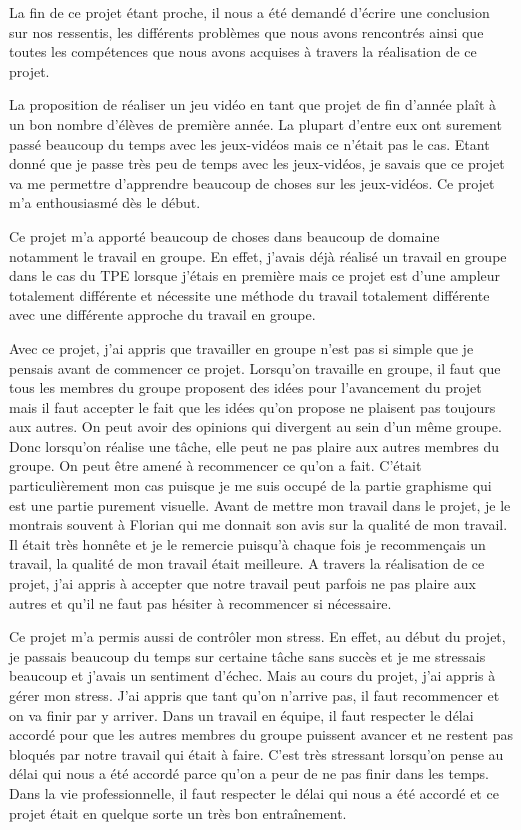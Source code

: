 \documentclass[a4paper, 12pt]{article}
\begin{document}
La fin de ce projet étant proche, il nous a été demandé d’écrire une conclusion sur nos ressentis, les différents problèmes que nous avons rencontrés ainsi que toutes les compétences que nous avons acquises à travers la réalisation de ce projet.
\medbreak
\par La proposition de réaliser un jeu vidéo en tant que projet de fin d’année plaît à un bon nombre d’élèves de première année. La plupart d’entre eux ont surement passé beaucoup du temps avec les jeux-vidéos mais ce n’était pas le cas. Etant donné que je passe très peu de temps avec les jeux-vidéos, je savais que ce projet va me permettre d’apprendre beaucoup de choses sur les jeux-vidéos. Ce projet m’a enthousiasmé dès le début.
\medbreak
\par Ce projet m’a apporté beaucoup de choses dans beaucoup de domaine notamment le travail en groupe. En effet, j’avais déjà réalisé un travail en groupe dans le cas du TPE lorsque j’étais en première mais ce projet est d’une ampleur totalement différente et nécessite une méthode du travail totalement différente avec une différente approche du travail en groupe.
\medbreak
\par Avec ce projet, j’ai appris que travailler en groupe n’est pas si simple que je pensais avant de commencer ce projet. Lorsqu’on travaille en groupe, il faut que tous les membres du groupe proposent des idées pour l’avancement du projet mais il faut accepter le fait que les idées qu’on propose ne plaisent pas toujours aux autres. On peut avoir des opinions qui divergent au sein d’un même groupe. Donc lorsqu’on réalise une tâche, elle peut ne pas plaire aux autres membres du groupe.  On peut être amené à recommencer ce qu’on a fait. C’était particulièrement mon cas puisque je me suis occupé de la partie graphisme qui est une partie purement visuelle.  Avant de mettre mon travail dans le projet, je le montrais souvent à Florian qui me donnait son avis sur la qualité de mon travail. Il était très honnête et je le remercie puisqu’à chaque fois je recommençais un travail, la qualité de mon travail était meilleure. A travers la réalisation de ce projet, j’ai appris à accepter que notre travail peut parfois ne pas plaire aux autres et qu’il ne faut pas hésiter à recommencer si nécessaire.
\medbreak
\par Ce projet m’a permis aussi de contrôler mon stress.  En effet, au début du projet, je passais beaucoup du temps sur certaine tâche sans succès et je me stressais beaucoup et j’avais un sentiment d’échec. Mais au cours du projet, j’ai appris à gérer mon stress. J’ai appris que tant qu’on n’arrive pas, il faut recommencer et on va finir par y arriver. Dans un travail en équipe, il faut respecter le délai accordé pour que les autres membres du groupe puissent avancer et ne restent pas bloqués par notre travail qui était à faire. C’est très stressant lorsqu’on pense au délai qui nous a été accordé parce qu’on a peur de ne pas finir dans les temps. Dans la vie professionnelle, il faut respecter le délai qui nous a été accordé et ce projet était en quelque sorte un très bon entraînement.
\end{document}
